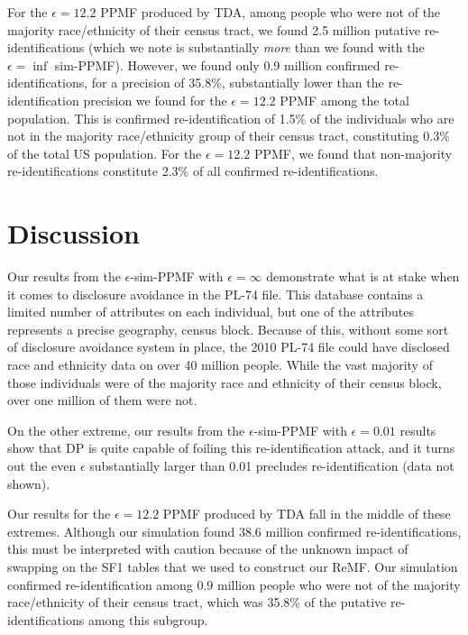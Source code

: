 \documentclass{article}
\begin{document}
For the $\epsilon=12.2$ PPMF produced by TDA, among people who were not of the majority race/ethnicity of their census tract, we found 2.5 million putative re-identifications (which we note is substantially \emph{more} than we found with the $\epsilon=\inf$ sim-PPMF).  However, we found only 0.9 million confirmed re-identifications, for a precision of 35.8\%, substantially lower than the re-identification precision we found for the $\epsilon=12.2$ PPMF among the total population.  This is confirmed re-identification of 1.5\% of the individuals who are not in the majority race/ethnicity group of their census tract, constituting 0.3\% of the total US population.  For the $\epsilon=12.2$ PPMF, we found that non-majority re-identifications constitute 2.3\% of all confirmed re-identifications.



\section{Discussion}

Our results from the $\epsilon$-sim-PPMF with $\epsilon=\infty$ demonstrate what is at stake when it comes to disclosure avoidance in the PL-74 file.  This database contains a limited number of attributes on each individual, but one of the attributes represents a precise geography, census block.  Because of this, without some sort of disclosure avoidance system in place, the 2010 PL-74 file could have disclosed race and ethnicity data on over 40 million people.  While the vast majority of those individuals were of the majority race and ethnicity of their census block, over one million of them were not.

On the other extreme, our results from the $\epsilon$-sim-PPMF with $\epsilon=0.01$ results show that DP is quite capable of foiling this re-identification attack, and it turns out the even $\epsilon$ substantially larger than 0.01 precludes re-identification (data not shown).

Our results for the $\epsilon=12.2$ PPMF produced by TDA fall in the middle of these extremes.  Although our simulation found 38.6 million confirmed re-identifications, this must be interpreted with caution because of the unknown impact of swapping on the SF1 tables that we used to construct our ReMF.  Our simulation confirmed re-identification among 0.9 million people who were not of the majority race/ethnicity of their census tract, which was 35.8\% of the putative re-identifications among this subgroup.
\end{document}
